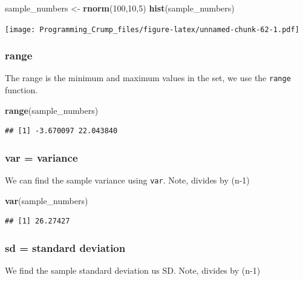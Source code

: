 \documentclass[]{book}
\newenvironment{Shaded}{\begin{snugshade}}{\end{snugshade}}
\newcommand{\KeywordTok}[1]{\textcolor[rgb]{0.13,0.29,0.53}{\textbf{{#1}}}}
\newcommand{\DecValTok}[1]{\textcolor[rgb]{0.00,0.00,0.81}{{#1}}}
\newcommand{\StringTok}[1]{\textcolor[rgb]{0.31,0.60,0.02}{{#1}}}
\newcommand{\NormalTok}[1]{{#1}}
\theoremstyle{definition}
\theoremstyle{definition}
\theoremstyle{definition}
\theoremstyle{remark}
\begin{document}
\begin{Shaded}
\begin{Highlighting}[]
\NormalTok{sample_numbers <-}\StringTok{ }\KeywordTok{rnorm}\NormalTok{(}\DecValTok{100}\NormalTok{,}\DecValTok{10}\NormalTok{,}\DecValTok{5}\NormalTok{)}
\KeywordTok{hist}\NormalTok{(sample_numbers)}
\end{Highlighting}
\end{Shaded}

\texttt{[image: Programming\_Crump\_files/figure-latex/unnamed-chunk-62-1.pdf]}

\subsubsection{range}\label{range}

The range is the minimum and maximum values in the set, we use the
\texttt{range} function.

\begin{Shaded}
\begin{Highlighting}[]
\KeywordTok{range}\NormalTok{(sample_numbers)}
\end{Highlighting}
\end{Shaded}

\begin{verbatim}
## [1] -3.670097 22.043840
\end{verbatim}

\subsubsection{var = variance}\label{var-variance}

We can find the sample variance using \texttt{var}. Note, divides by
(n-1)

\begin{Shaded}
\begin{Highlighting}[]
\KeywordTok{var}\NormalTok{(sample_numbers)}
\end{Highlighting}
\end{Shaded}

\begin{verbatim}
## [1] 26.27427
\end{verbatim}

\subsubsection{sd = standard deviation}\label{sd-standard-deviation}

We find the sample standard deviation us SD. Note, divides by (n-1)
\end{document}
